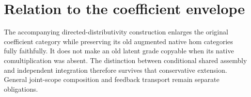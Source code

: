 \documentclass{article}
\begin{document}
\section{Relation to the coefficient envelope}
The accompanying directed-distributivity construction enlarges the original coefficient category while preserving its old augmented native hom categories fully faithfully. It does not make an old latent grade copyable when its native comultiplication was absent. The distinction between conditional shared assembly and independent integration therefore survives that conservative extension. General joint-scope composition and feedback transport remain separate obligations.
\end{document}
